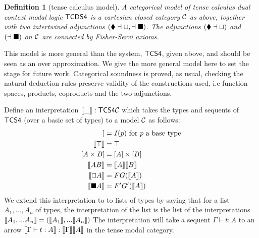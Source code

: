 \documentclass{article}
\let\Diamond\relax
\newcommand{\bLozenge}{\mathbin{\blacklozenge}}
\let\to\relax
\newcommand{\to}{\rightarrow}
\renewcommand{\Box}{\oblong}
\def\sem#1{[\hspace{-0.05cm}[#1]\hspace{-0.05cm}]}
\newtheorem{definition}[theorem]{Definition}
\begin{document}

\begin{definition}[tense calculus model]
A categorical model of tense calculus dual context modal logic
$\sf{TCDS4}$ is a cartesian closed category $\cal{C}$ as above,
together with two intertwined adjunctions $(\bLozenge\dashv \Box,
\Diamond\dashv \blacksquare)$.  The adjunctions $(\bLozenge\dashv
\Box)$ and $(\Diamond\dashv \blacksquare)$ on $\cal{C}$ are connected
by Fisher-Servi axioms.
\end{definition}

This model is more general than the system, $\sf{TCS4}$, given above,
and should be seen as an over approximation.  We give the more general
model here to set the stage for future work. Categorical soundness is
proved, as usual, checking the natural deduction rules preserve
validity of the constructions used, i.e function spaces, products,
coproducts and the two adjunctions.

Define an interpretation $\sem{\_} : \sf{TCS4} \to {\cal C}$ which
takes the types and sequents of $\sf{TCS4}$ (over a basic set of
types) to a model $\cal C$ as follows:
\begin{align*}
\sem{p} &= I(p) \mbox{  for $p$ a base type}\\
\sem{\top} &= \top\\
[A\times B] &= [A]\times [B]\\
\sem{  A \to B  } &=  \sem{ A}  \to  \sem{ B }\\
\sem{\Box A} &= F G(\sem{A})\\
\sem{\blacksquare A} &= F' G'(\sem{A})
\end{align*}
 We extend this interpretation to 
 to lists of types by saying that for a list $A_1, ..., A_n$ of types,
 the interpretation of the list is the list of the interpretations
 $\sem{A_1,...A_n} = (\sem{A_1}, . . . \sem{A_n})$ 
The interpretation will take a sequent $\Gamma \vdash t : A$ to an arrow 
$ \sem {\Gamma \vdash t : A} : \sem{ \Gamma} \to \sem{A} $
in the tense modal category.
\end{document}

